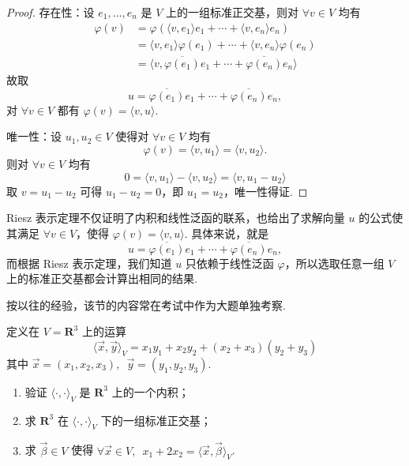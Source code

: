 \begin{proof}
    存在性：设 $e_1, \ldots , e_n$ 是 $ V $ 上的一组标准正交基，则对 $\forall v \in V $ 均有
    \begin{align*}
        \varphi (v) & = \varphi(\langle v, e_1 \rangle e_1 + \cdots + \langle v, e_n \rangle e_n ) \\
                    & = \langle v, e_1 \rangle \varphi (e_1) + \cdots + \langle v, e_n \rangle \varphi (e_n) \\
                    & = \langle v, \overline{\varphi(e_1)}e_1 + \cdots + \overline{\varphi(e_n)}e_n \rangle
    \end{align*}
    故取
    \[ u = \overline{\varphi(e_1)}e_1 + \cdots + \overline{\varphi(e_n)}e_n, \]
    对 $\forall v \in V$ 都有 $\varphi(v) = \langle v, u \rangle .$

    唯一性：设 $ u_1, u_2 \in V $ 使得对 $\forall v \in V $ 均有
    \[\varphi(v) = \langle v, u_1 \rangle = \langle v, u_2 \rangle.\]
    则对 $\forall v \in V $ 均有
    \[ 0 = \langle v, u_1 \rangle - \langle v, u_2 \rangle = \langle v, u_1 - u_2 \rangle\]
    取 $ v = u_1 - u_2 $ 可得 $ u_1 - u_2 = 0 $，即 $ u_1 = u_2 $，唯一性得证.
\end{proof}

Riesz 表示定理不仅证明了内积和线性泛函的联系，也给出了求解向量 $ u $ 的公式使其满足
$ \forall v \in V $，使得 $ \varphi(v) = \langle v, u\rangle $. 具体来说，就是
\[ u = \overline{\varphi(e_1)}e_1 + \cdots + \overline{\varphi(e_n)}e_n, \]
而根据 Riesz 表示定理，我们知道 $ u $ 只依赖于线性泛函 $ \varphi $，所以选取任意一组
$ V $ 上的标准正交基都会计算出相同的结果.

按以往的经验，该节的内容常在考试中作为大题单独考察.
\begin{example}
    定义在 $ V = \mathbf{R}^3 $ 上的运算
    \[ \langle \vec{x}, \vec{y} \rangle_V = x_1 y_1 + x_2 y_2 + (x_2 + x_3)(y_2 + y_3) \]
    其中 $ \vec{x} = (x_1, x_2, x_3),\enspace \vec{y} = (y_1, y_2, y_3) $.
    \begin{enumerate}
        \item 验证 $ \langle \cdot, \cdot \rangle_V $ 是 $ \mathbf{R}^3 $ 上的一个内积；

        \item 求 $ \mathbf{R}^3 $ 在 $ \langle \cdot, \cdot \rangle_V $ 下的一组标准正交基；

        \item 求 $ \vec{\beta} \in V $ 使得 $ \forall \vec{x} \in V,\enspace x_1 + 2x_2 = \langle \vec{x}, \vec{\beta} \rangle_V $.
    \end{enumerate}
\end{example}

